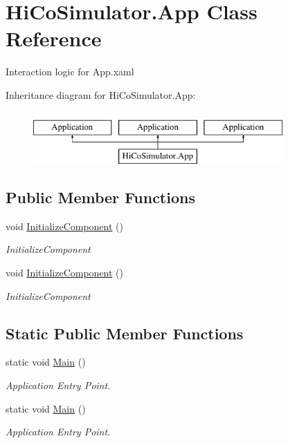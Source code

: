 \hypertarget{class_hi_co_simulator_1_1_app}{}\section{Hi\+Co\+Simulator.\+App Class Reference}
\label{class_hi_co_simulator_1_1_app}


Interaction logic for App.\+xaml  


Inheritance diagram for Hi\+Co\+Simulator.\+App\+:\begin{figure}[H]
\begin{center}
\leavevmode
\includegraphics[height=2.000000cm]{class_hi_co_simulator_1_1_app}
\end{center}
\end{figure}
\subsection*{Public Member Functions}
\begin{DoxyCompactItemize}
\item 
void \hyperlink{class_hi_co_simulator_1_1_app_a0bc9334b2627124a4d4bbdbde2d14a49}{Initialize\+Component} ()
\begin{DoxyCompactList}\small\item\em Initialize\+Component \end{DoxyCompactList}\item 
void \hyperlink{class_hi_co_simulator_1_1_app_a0bc9334b2627124a4d4bbdbde2d14a49}{Initialize\+Component} ()
\begin{DoxyCompactList}\small\item\em Initialize\+Component \end{DoxyCompactList}\end{DoxyCompactItemize}
\subsection*{Static Public Member Functions}
\begin{DoxyCompactItemize}
\item 
static void \hyperlink{class_hi_co_simulator_1_1_app_abb5ff4d3d9123cab96e96cda9cb8619e}{Main} ()
\begin{DoxyCompactList}\small\item\em Application Entry Point. \end{DoxyCompactList}\item 
static void \hyperlink{class_hi_co_simulator_1_1_app_abb5ff4d3d9123cab96e96cda9cb8619e}{Main} ()
\begin{DoxyCompactList}\small\item\em Application Entry Point. \end{DoxyCompactList}\end{DoxyCompactItemize}


